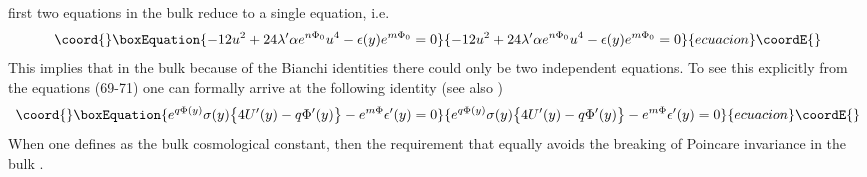 \documentclass[a4paper,12pt]{article}
\providecommand {\nn} {\nonumber}
\begin{document}
first two equations in the bulk reduce to a single equation, i.e.
\begin{equation}\coord{}\boxEquation{
-12u^2+24\lambda'\alpha e^{n\Phi_0}u^4-\epsilon(y) e^{m\Phi_0}=0\nn
}{
-12u^2+24\lambda'\alpha e^{n\Phi_0}u^4-\epsilon(y) e^{m\Phi_0}=0\nn
}{ecuacion}\coordE{}\end{equation}
This implies that in the bulk because of the Bianchi identities there 
could only be two independent equations. To see this explicitly from the 
equations (69-71) one can formally arrive at the following identity (see 
also \cite{NIC})  
\begin{equation}\coord{}\boxEquation{
e^{q\Phi(y)}\sigma(y)\big\{4U'(y)-q\Phi'(y)\big\}-e^{m\Phi}\epsilon'(y)=0
}{
e^{q\Phi(y)}\sigma(y)\big\{4U'(y)-q\Phi'(y)\big\}-e^{m\Phi}\epsilon'(y)=0
}{ecuacion}\coordE{}\end{equation}
When one defines \coordHE{} as the bulk cosmological 
constant, then the requirement that \coordHE{} equally avoids the 
breaking of Poincare invariance in the bulk \cite{RS1,VAR,NIC}.
\end{document}
